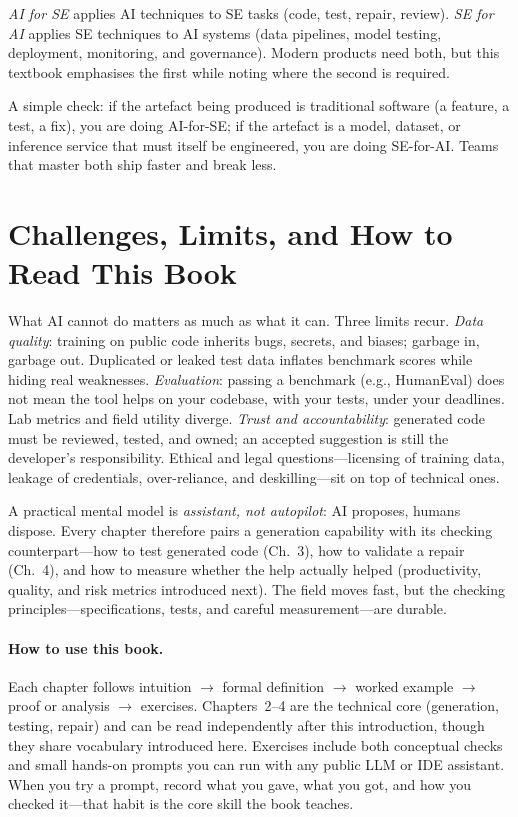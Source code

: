 \begin{definition}
\emph{AI for SE} applies AI techniques to SE tasks (code, test, repair, review). \emph{SE for AI} applies SE techniques to AI systems (data pipelines, model testing, deployment, monitoring, and governance). Modern products need both, but this textbook emphasises the first while noting where the second is required.
\end{definition}

A simple check: if the artefact being produced is traditional software (a feature, a test, a fix), you are doing AI-for-SE; if the artefact is a model, dataset, or inference service that must itself be engineered, you are doing SE-for-AI. Teams that master both ship faster and break less.

\section{Challenges, Limits, and How to Read This Book}
\label{sec:challenges}
What AI cannot do matters as much as what it can. Three limits recur. \emph{Data quality}: training on public code inherits bugs, secrets, and biases; garbage in, garbage out. Duplicated or leaked test data inflates benchmark scores while hiding real weaknesses. \emph{Evaluation}: passing a benchmark (e.g., HumanEval) does not mean the tool helps on your codebase, with your tests, under your deadlines. Lab metrics and field utility diverge. \emph{Trust and accountability}: generated code must be reviewed, tested, and owned; an accepted suggestion is still the developer's responsibility. Ethical and legal questions---licensing of training data, leakage of credentials, over-reliance, and deskilling---sit on top of technical ones.

A practical mental model is \emph{assistant, not autopilot}: AI proposes, humans dispose. Every chapter therefore pairs a generation capability with its checking counterpart---how to test generated code (Ch.~3), how to validate a repair (Ch.~4), and how to measure whether the help actually helped (productivity, quality, and risk metrics introduced next). The field moves fast, but the checking principles---specifications, tests, and careful measurement---are durable.

\paragraph{How to use this book.} Each chapter follows intuition $\to$ formal definition $\to$ worked example $\to$ proof or analysis $\to$ exercises. Chapters~2--4 are the technical core (generation, testing, repair) and can be read independently after this introduction, though they share vocabulary introduced here. Exercises include both conceptual checks and small hands-on prompts you can run with any public LLM or IDE assistant. When you try a prompt, record what you gave, what you got, and how you checked it---that habit is the core skill the book teaches.

